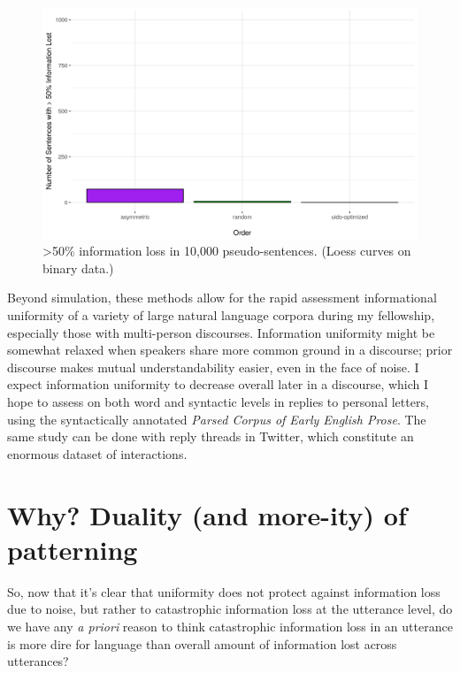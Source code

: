 \documentclass[12pt]{article}
\begin{document}
\begin{figure}
	\begin{center}
\includegraphics[width=1.115\textwidth]{uid-sim-majority.png}
\caption{>50\% information loss in 10,000 pseudo-sentences. (Loess curves on binary data.)}
\label{sim}
\end{center}
\end{figure}

Beyond simulation, these methods allow for the rapid assessment informational uniformity of a variety of large natural language corpora during my fellowship, especially those with multi-person discourses. Information uniformity might be somewhat relaxed when speakers share more common ground in a discourse; prior discourse makes mutual understandability easier, even in the face of noise. I expect information uniformity to decrease overall later in a discourse, which I hope to assess on both word and syntactic levels in replies to personal letters, using the syntactically annotated \textsl{Parsed Corpus of Early English Prose}. The same study can be done with reply threads in Twitter, which constitute an enormous dataset of interactions.


\section{Why? Duality (and more-ity) of patterning}
\label{moreity}

So, now that it's clear that uniformity does not protect against information loss due to noise, but rather to catastrophic information loss at the utterance level, do we have any \textsl{a priori} reason to think catastrophic information loss in an utterance is more dire for language than overall amount of information lost across utterances? 
\end{document}
